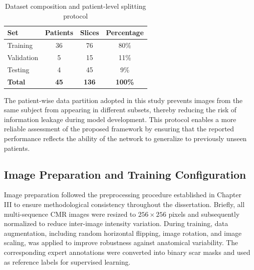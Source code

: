 \begin{table}[h]
		\centering
		\caption{Dataset composition and patient-level splitting protocol} %
		\label{tab:ch6-partition}
		\begin{tabular}{lccc}
			\toprule
			\textbf{Set} & \textbf{Patients} & \textbf{Slices} & \textbf{Percentage} \\ \midrule
			Training     & 36                & 76              & 80\%       \\ 
			Validation   & 5                 & 15              & 11\%       \\ 
			Testing      & 4                 & 45              & 9\%        \\ \midrule
			\textbf{Total} & \textbf{45}     & \textbf{136}    & \textbf{100\%} \\ \bottomrule
		\end{tabular}
\end{table}
	

The patient-wise data partition adopted in this study prevents images from the same subject from appearing in different subsets, thereby reducing the risk of information leakage during model development. This protocol enables a more reliable assessment of the proposed framework by ensuring that the reported performance reflects the ability of the network to generalize to previously unseen patients.

\subsection{Image Preparation and Training Configuration}
\label{subsec:ch6-preparation}

Image preparation followed the preprocessing procedure established in Chapter III to ensure methodological consistency throughout the dissertation. Briefly, all multi-sequence CMR images were resized to $256 \times 256$ pixels and subsequently normalized to reduce inter-image intensity variation. During training, data augmentation, including random horizontal flipping, image rotation, and image scaling, was applied to improve robustness against anatomical variability. The corresponding expert annotations were converted into binary scar masks and used as reference labels for supervised learning.

